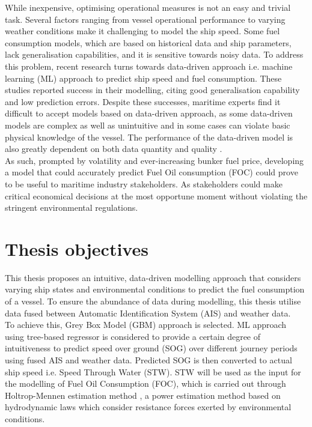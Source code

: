 While inexpensive, optimising operational measures is not an easy and trivial task. Several factors ranging from vessel operational performance to varying weather conditions make it challenging to model the ship speed. Some fuel consumption models, which are based on historical data and ship parameters, lack generalisation capabilities, and it is sensitive towards noisy data. To address this problem, recent research turns towards data-driven approach i.e. machine learning (ML) approach to predict ship speed and fuel consumption. These studies reported success in their modelling, citing good generalisation capability and low prediction errors. Despite these successes, maritime experts find it difficult to accept models based on data-driven approach, as some data-driven models are complex as well as unintuitive and in some cases can violate basic physical knowledge of the vessel. The performance of the data-driven model is also greatly dependent on both data quantity and quality .\\      

As such, prompted by volatility and ever-increasing bunker fuel price, developing a model that could accurately predict Fuel Oil consumption (FOC) could prove to be useful to maritime industry stakeholders. As stakeholders could make critical economical decisions at the most opportune moment without violating the stringent environmental regulations. \\

\section{Thesis objectives}\label{sec:objectives}

This thesis proposes an intuitive, data-driven modelling approach that considers varying ship states and environmental conditions to predict the fuel consumption of a vessel. To ensure the abundance of data during modelling, this thesis utilise data fused between Automatic Identification System (AIS) and weather data.\\

To achieve this, Grey Box Model (GBM) approach is selected. ML approach using tree-based regressor is considered to provide a certain degree of intuitiveness to predict speed over ground (SOG) over different journey periods using fused AIS and weather data. Predicted SOG is then converted to actual ship speed i.e. Speed Through Water (STW). STW will be used as the input for the modelling of Fuel Oil Consumption (FOC), which is carried out through Holtrop-Mennen estimation method , a power estimation method based on hydrodynamic laws which consider resistance forces exerted by environmental conditions.\\

